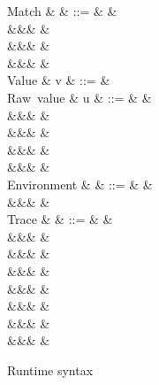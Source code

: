 \begin{figure}
\begin{syntaxfig}
\mbox{Match}
&
\xi
&
::=
&
&
\\
&&&
&
\\
&&&
&
\\
&&&
&
\\[2mm]
\mbox{Value}
&
v
&
::=
&
\\[2mm]
\mbox{Raw value}
&
u
&
::=
&
&
\\
&&&
&
\\
&&&
&
\\
&&&
\exNil
&
\\
&&&
&
\\[2mm]
\mbox{Environment}
&
\rho
&
::=
&
\envEmpty
&
\\
&&&
&
\\[2mm]
\mbox{Trace}
&
&
::=
&
&
\\
&&&
&
\\
&&&
&
\\
&&&
\trNil
&
\\
&&&
&
\\
&&&
&
\\
&&&
&
\\
&&&
&
\end{syntaxfig}
\caption{Runtime syntax}
\end{figure}

